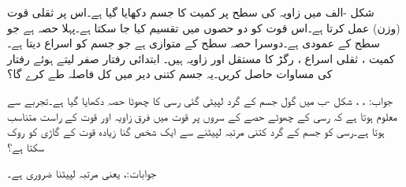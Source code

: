 شکل -الف میں  زاویہ کی سطح پر  کمیت کا جسم دکھایا گیا ہے۔اس پر ثقلی قوت (وزن)  عمل کرتا ہے۔اس قوت کو دو حصوں میں تقسیم کیا جا سکتا ہے۔پہلا حصہ  ہے جو سطح کے عمودی ہے۔دوسرا حصہ سطح کے متوازی ہے جو جسم کو اسراع دیتا ہے۔  کمیت ، ثقلی اسراع ، رگڑ کا مستقل  اور زاویہ  ہیں۔ ابتدائی رفتار صفر لیتے ہوئے رفتار  کی مساوات حاصل کریں۔یہ جسم کتنی دیر میں کل  فاصلہ طے کرے گا؟

جواب: ، ، 
شکل -ب میں گول جسم کے گرد لپیٹی گئی رسی کا چھوٹا حصہ دکھایا گیا ہے۔تجربے سے معلوم ہوتا ہے کہ رسی کے چھوٹے حصے کے سروں پر قوت میں فرق زاویہ  اور قوت  کے راست متناسب ہوتا ہے۔رسی کو جسم کے گرد کتنی مرتبہ لپیٹنے سے ایک شخص  گنا زیادہ قوت کے گاڑی کو روک سکتا ہے؟

جوابات:،  یعنی  مرتبہ لپیٹنا ضروری ہے۔

